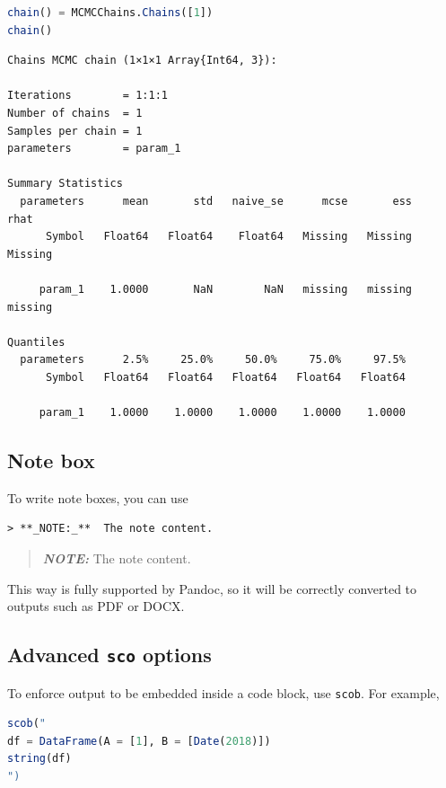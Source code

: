 \documentclass[
  notoc %
]{tufte-book}
\newcommand{\passthrough}[1]{#1}
\begin{document}
\begin{lstlisting}[language=Julia]
chain() = MCMCChains.Chains([1])
chain()
\end{lstlisting}

\begin{lstlisting}[language=Output]
Chains MCMC chain (1×1×1 Array{Int64, 3}):

Iterations        = 1:1:1
Number of chains  = 1
Samples per chain = 1
parameters        = param_1

Summary Statistics
  parameters      mean       std   naive_se      mcse       ess      rhat
      Symbol   Float64   Float64    Float64   Missing   Missing   Missing

     param_1    1.0000       NaN        NaN   missing   missing   missing

Quantiles
  parameters      2.5%     25.0%     50.0%     75.0%     97.5%
      Symbol   Float64   Float64   Float64   Float64   Float64

     param_1    1.0000    1.0000    1.0000    1.0000    1.0000

\end{lstlisting}

\hypertarget{note-box}{%
\subsection{Note box}\label{note-box}}

To write note boxes, you can use

\begin{lstlisting}
> **_NOTE:_**  The note content.
\end{lstlisting}

\begin{quote}
\textbf{\emph{NOTE:}} The note content.
\end{quote}

This way is fully supported by Pandoc, so it will be correctly converted
to outputs such as PDF or DOCX.

\hypertarget{advanced-sco-options}{%
\subsection{\texorpdfstring{Advanced \texttt{sco}
options}{Advanced sco options}}\label{advanced-sco-options}}

To enforce output to be embedded inside a code block, use
\passthrough{\lstinline!scob!}. For example,

\begin{lstlisting}[language=Julia]
scob("
df = DataFrame(A = [1], B = [Date(2018)])
string(df)
")
\end{lstlisting}
\end{document}
